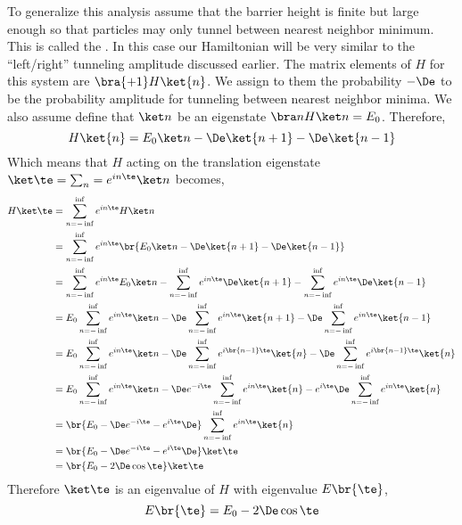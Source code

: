 \documentclass{article}
\begin{document}
To generalize this analysis assume that the barrier height is finite but large enough so that particles may only tunnel between nearest neighbor minimum. This is called the . In this case our Hamiltonian will be very similar to the ``left/right'' tunneling amplitude discussed earlier. The matrix elements of $H$ for this system are $\bra{+1} H \ket{n}$. We assign to them the probability $- \De$ to be the probability amplitude for tunneling between nearest neighbor minima. We also assume define that $\ket n$ be an eigenstate $\bra n H \ket n = E_0$. Therefore,
\[H\ket{n} = E_0 \ket n - \De \ket {n+1} - \De \ket{n-1} \]
Which means that $H$ acting on the translation eigenstate $\ket \te  = \sum_n = e^{i n \te} \ket n$ becomes,
\begin{align*}
H\ket \te
&= \sum_{n=-\inf}^{\inf} e^{i n \te} H \ket n \\
&= \sum_{n=-\inf}^{\inf} e^{i n \te} \br{E_0 \ket n - \De \ket {n+1} - \De \ket{n-1}} \\
&= \sum_{n=-\inf}^{\inf} e^{i n \te} E_0 \ket n - \sum_{n=-\inf}^{\inf} e^{i n \te} \De \ket {n+1} - \sum_{n=-\inf}^{\inf} e^{i n \te} \De \ket{n-1} \\
&= E_0\sum_{n=-\inf}^{\inf} e^{i n \te} \ket n - \De\sum_{n=-\inf}^{\inf} e^{i n \te} \ket {n+1} - \De\sum_{n=-\inf}^{\inf} e^{i n \te} \ket{n-1} \\
&= E_0\sum_{n=-\inf}^{\inf} e^{i n \te} \ket n - \De\sum_{n=-\inf}^{\inf} e^{i \br{n-1} \te} \ket {n} - \De\sum_{n=-\inf}^{\inf} e^{i \br{n-1} \te} \ket{n} \\
&= E_0\sum_{n=-\inf}^{\inf} e^{i n \te} \ket n - \De e^{-i \te}\sum_{n=-\inf}^{\inf} e^{i n \te} \ket {n} - e^{i \te}\De\sum_{n=-\inf}^{\inf} e^{i n \te} \ket{n} \\
&= \br{E_0 - \De e^{-i \te} - e^{i \te}\De}\sum_{n=-\inf}^{\inf} e^{i n \te} \ket{n} \\
&= \br{E_0 - \De e^{-i \te} - e^{i \te}\De}\ket \te \\
&= \br{E_0 - 2 \De \cos \te}\ket \te
\end{align*}
Therefore $\ket \te$ is an eigenvalue of $H$ with eigenvalue $E\br{\te}$,
\[ E\br{\te} = E_0 - 2 \De \cos \te \]
\end{document}
